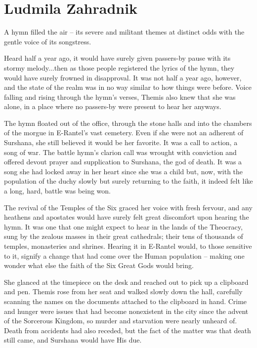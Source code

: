\chapter{Ludmila Zahradnik}

A hymn filled the air – its severe and militant themes at distinct odds with the gentle voice of its songstress.

 

Heard half a year ago, it would have surely given passers-by pause with its stormy melody...then as those people registered the lyrics of the hymn, they would have surely frowned in disapproval. It was not half a year ago, however, and the state of the realm was in no way similar to how things were before. Voice falling and rising through the hymn’s verses, Themis also knew that she was alone, in a place where no passers-by were present to hear her anyways.

 

The hymn floated out of the office, through the stone halls and into the chambers of the morgue in E-Rantel's vast cemetery. Even if she were not an adherent of Surshana, she still believed it would be her favorite. It was a call to action, a song of war. The battle hymn’s clarion call was wrought with conviction and offered devout prayer and supplication to Surshana, the god of death. It was a song she had locked away in her heart since she was a child but, now, with the population of the duchy slowly but surely returning to the faith, it indeed felt like a long, hard, battle was being won.

 

The revival of the Temples of the Six graced her voice with fresh fervour, and any heathens and apostates would have surely felt great discomfort upon hearing the hymn. It was one that one might expect to hear in the lands of the Theocracy, sung by the zealous masses in their great cathedrals; their tens of thousands of temples, monasteries and shrines. Hearing it in E-Rantel would, to those sensitive to it, signify a change that had come over the Human population – making one wonder what else the faith of the Six Great Gods would bring.

 

She glanced at the timepiece on the desk and reached out to pick up a clipboard and pen. Themis rose from her seat and walked slowly down the hall, carefully scanning the names on the documents attached to the clipboard in hand. Crime and hunger were issues that had become nonexistent in the city since the advent of the Sorcerous Kingdom, so murder and starvation were nearly unheard of. Death from accidents had also receded, but the fact of the matter was that death still came, and Surshana would have His due.

